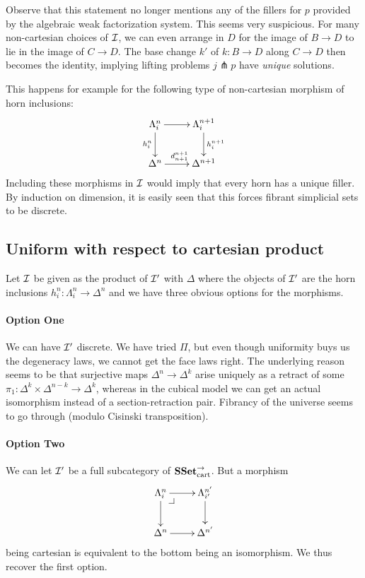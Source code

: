 \documentclass[reqno,10pt,a4paper,oneside]{amsart}
\begin{document}
Observe that this statement no longer mentions any of the fillers for $p$ provided by the algebraic weak factorization system.
This seems very suspicious.
For many non-cartesian choices of $\cal{I}$, we can even arrange in $D$ for the image of $B \to D$ to lie in the image of $C \to D$.
The base change $k'$ of $k : B \to D$ along $C \to D$ then becomes the identity, implying lifting problems $j \pitchfork p$ have \emph{unique} solutions.

This happens for example for the following type of non-cartesian morphism of horn inclusions:
\[
\xymatrix{
  \Lambda_i^n
  \ar[r]
  \ar[d]_{h_i^n}
&
  \Lambda_i^{n+1}
  \ar[d]^{h_i^{n+1}}
\\
  \Delta^n
  \ar[r]^{d_{n+1}^{n+1}}
&
  \Delta^{n+1}
}
\]
Including these morphisms in $\cal{I}$ would imply that every horn has a unique filler.
By induction on dimension, it is easily seen that this forces fibrant simplicial sets to be discrete.

\subsection*{Uniform with respect to cartesian product}

Let $\cal{I}$ be given as the product of $\cal{I'}$ with $\Delta$ where the objects of $\cal{I'}$ are the horn inclusions $h_i^n : \Lambda_i^n \to \Delta^n$ and we have three obvious options for the morphisms.

\paragraph{Option One}

We can have $\cal{I'}$ discrete.
We have tried $\Pi$, but even though uniformity buys us the degeneracy laws, we cannot get the face laws right.
The underlying reason seems to be that surjective maps $\Delta^n \to \Delta^k$ arise uniquely as a retract of some $\pi_1 : \Delta^k \times \Delta^{n-k} \to \Delta^k$, whereas in the cubical model we can get an actual isomorphism instead of a section-retraction pair.
Fibrancy of the universe seems to go through (modulo Cisinski transposition).

\paragraph{Option Two}

We can let $\cal{I'}$ be a full subcategory of $\SSet_{\text{cart}}^{\to}$.
But a morphism
\[
\xymatrix{
  \Lambda_i^n
  \ar[r]
  \ar[d]
  \pullback{dr}
&
  \Lambda_{i'}^{n'}
  \ar[d]
\\
  \Delta^n
  \ar[r]
&
  \Delta^{n'}
}
\]
being cartesian is equivalent to the bottom being an isomorphism.
We thus recover the first option.
\end{document}
